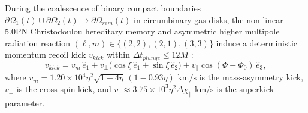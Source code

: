 \documentclass[11pt,a4paper,reqno]{article}
\def\bm#1{#1}%
\def\mathrm#1{#1}%
\theoremstyle{plain}
\theoremstyle{definition}
\theoremstyle{remark}
\numberwithin{equation}{section}
\begin{document}
During the coalescence of binary compact boundaries $\partial\Omega_1(t) \cup \partial\Omega_2(t) \to \partial\Omega_{\mathrm{rem}}(t)$ in circumbinary gas disks, the non-linear 5.0PN Christodoulou hereditary memory and asymmetric higher multipole radiation reaction $(\ell, m) \in \{(2,2), (2,1), (3,3)\}$ induce a deterministic momentum recoil kick $\bm{v}_{\mathrm{kick}}$ within $\Delta t_{\mathrm{plunge}} \le 12M$ \cite{Campanelli2007, Gonzalez2007}:
\begin{equation}
\bm{v}_{\mathrm{kick}} = v_m\,\hat{\bm{e}}_1 + v_\perp\big(\cos\xi\,\hat{\bm{e}}_1 + \sin\xi\,\hat{\bm{e}}_2\big) + v_\parallel\cos(\Phi - \Phi_0)\,\hat{\bm{e}}_3,
\label{eq:recoil_kick_vector}
\end{equation}
where $v_m = 1.20 \times 10^4 \eta^2 \sqrt{1-4\eta}\,(1 - 0.93\eta)\text{ km/s}$ is the mass-asymmetry kick, $v_\perp$ is the cross-spin kick, and $v_\parallel \approx 3.75 \times 10^3 \eta^2 \Delta \chi_\parallel\text{ km/s}$ is the superkick parameter.
\end{document}
